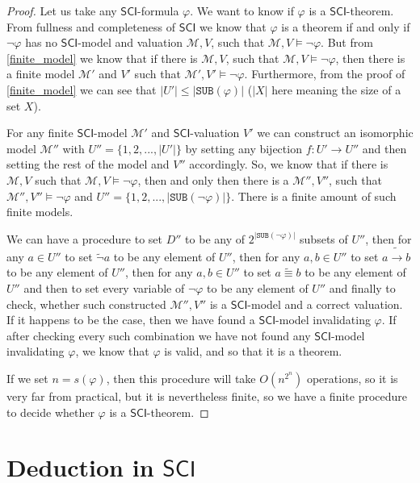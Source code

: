 \documentclass{article}
\theoremstyle{definition}
\theoremstyle{definition}
\theoremstyle{definition}
\theoremstyle{definition}
\theoremstyle{definition}
\newcommand*{\id}{\equiv}
\newcommand*{\ra}{\rightarrow}
\newcommand*{\SUB}{\texttt{SUB}}
\newcommand{\SCI}{$\mathsf{SCI}$\xspace}
\newcommand{\M}{\mathcal{M}\xspace}
\begin{document}
\begin{proof}
    Let us take any \SCI-formula $\varphi$. We want to know if $\varphi$ is a \SCI-theorem. From fullness and completeness of \SCI we know that $\varphi$ is a theorem if and only if $\lnot \varphi$ has no \SCI-model and valuation $\M, V$, such that $\M, V \models \lnot \varphi$. But from \cref{finite_model} we know that if there is $\M, V$, such that $\M, V \models \lnot \varphi$, then there is a finite model $\M'$ and $V'$ such that $\M', V' \models \lnot \varphi$. Furthermore, from the proof of \cref{finite_model} we can see that $|U'| \leq |\SUB(\varphi)|$ ($|X|$ here meaning the size of a set $X$).

    For any finite \SCI-model $\M'$ and \SCI-valuation $V'$ we can construct an
    isomorphic model $\M''$ with $U'' = \{1, 2, ..., |U'|\}$ by setting any
    bijection $f : U' \rightarrow U''$ and then setting the rest of the model and
    $V''$ accordingly. So, we know that if there is $\M, V$ such that $\M, V
        \models \lnot \varphi$, then and only then there is a $\M'', V''$, such that
    $\M'', V'' \models \lnot \varphi$ and $U'' = \{1, 2, ..., |\SUB(\lnot
        \varphi)|\}$. There is a finite amount of such finite models.

    We can have a procedure to set $D''$ to be any of $2^{|\SUB(\lnot \varphi)|}$
    subsets of $U''$, then for any $a \in U''$ to set $\tilde{\lnot}a$ to be any
    element of $U''$, then for any $a, b \in U''$ to set $a \tilde{\ra} b$ to be
    any element of $U''$, then for any $a, b \in U''$ to set $a \tilde{\id} b$ to
    be any element of $U''$ and then to set every variable of $\lnot \varphi$ to be
    any element of $U''$ and finally to check, whether such constructed $\M'', V''$
    is a \SCI-model and a correct valuation. If it happens to be the case, then we
    have found a \SCI-model invalidating $\varphi$. If after checking every such
    combination we have not found any \SCI-model invalidating $\varphi$, we know
    that $\varphi$ is valid, and so that it is a theorem.

    If we set $n = s(\varphi)$, then this procedure will take $O({n} ^ {2^n})$
    operations, so it is very far from practical, but it is nevertheless finite, so
    we have a finite procedure to decide whether $\varphi$ is a \SCI-theorem.

\end{proof}

\section{Deduction in \SCI}
\end{document}
